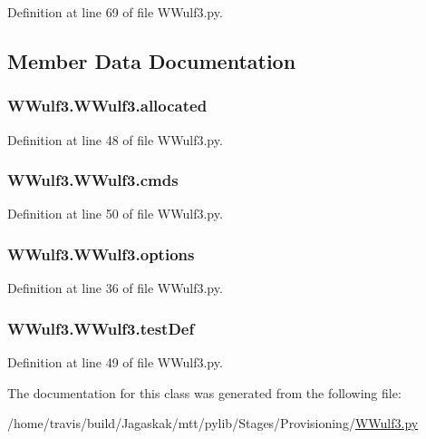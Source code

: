Definition at line 69 of file W\-Wulf3.\-py.



\subsection{Member Data Documentation}
\hypertarget{classWWulf3_1_1WWulf3_ad83bab03cfcdab3a5b689a0958db19e8}{
\subsubsection[{allocated}]{\setlength{\rightskip}{0pt plus 5cm}W\-Wulf3.\-W\-Wulf3.\-allocated}}\label{classWWulf3_1_1WWulf3_ad83bab03cfcdab3a5b689a0958db19e8}


Definition at line 48 of file W\-Wulf3.\-py.

\hypertarget{classWWulf3_1_1WWulf3_afb4fb9db2456e29872155d9b8738418f}{
\subsubsection[{cmds}]{\setlength{\rightskip}{0pt plus 5cm}W\-Wulf3.\-W\-Wulf3.\-cmds}}\label{classWWulf3_1_1WWulf3_afb4fb9db2456e29872155d9b8738418f}


Definition at line 50 of file W\-Wulf3.\-py.

\hypertarget{classWWulf3_1_1WWulf3_adff5ffd43f8b68d49c7b45ab48d7b428}{
\subsubsection[{options}]{\setlength{\rightskip}{0pt plus 5cm}W\-Wulf3.\-W\-Wulf3.\-options}}\label{classWWulf3_1_1WWulf3_adff5ffd43f8b68d49c7b45ab48d7b428}


Definition at line 36 of file W\-Wulf3.\-py.

\hypertarget{classWWulf3_1_1WWulf3_a9e8732432df9211bd64454c4c0e04098}{
\subsubsection[{test\-Def}]{\setlength{\rightskip}{0pt plus 5cm}W\-Wulf3.\-W\-Wulf3.\-test\-Def}}\label{classWWulf3_1_1WWulf3_a9e8732432df9211bd64454c4c0e04098}


Definition at line 49 of file W\-Wulf3.\-py.



The documentation for this class was generated from the following file\-:\begin{DoxyCompactItemize}
\item 
/home/travis/build/\-Jagaskak/mtt/pylib/\-Stages/\-Provisioning/\hyperlink{WWulf3_8py}{W\-Wulf3.\-py}\end{DoxyCompactItemize}
